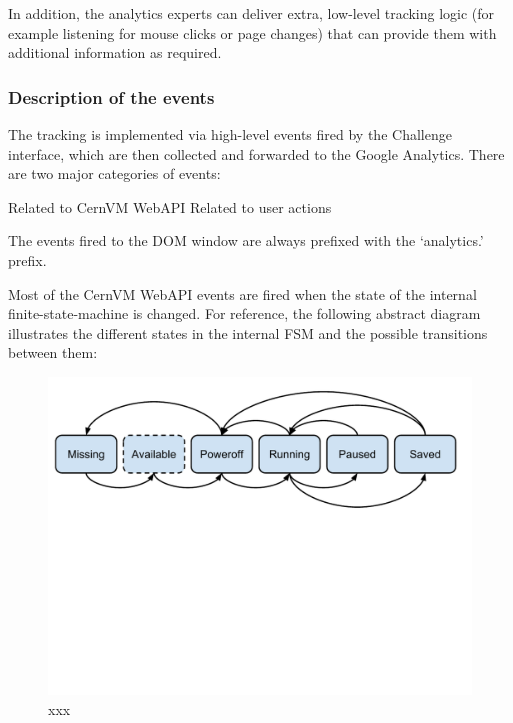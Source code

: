 \documentclass{article}
\begin{document}
In addition, the analytics experts can deliver extra, low-level tracking logic (for example listening for mouse clicks or page changes) that can provide them with additional information as required.

\subsubsection{Description of the events}

The tracking is implemented via high-level events fired by the Challenge interface, which are then collected and forwarded to the Google Analytics. There are two major categories of events:

Related to CernVM WebAPI 
Related to user actions

The events fired to the DOM window are always prefixed with the ‘analytics.’ prefix.


Most of the CernVM WebAPI events are fired when the state of the internal finite-state-machine is changed. For reference, the following abstract diagram illustrates the different states in the internal FSM and the possible transitions between them:



\begin{figure}[t]
  \begin{center}
		\includegraphics[width=\columnwidth]{imgs/webAPIEvents.pdf}
  \end{center}
\caption{xxx}
\label{xxx}
\end{figure}
\end{document}
